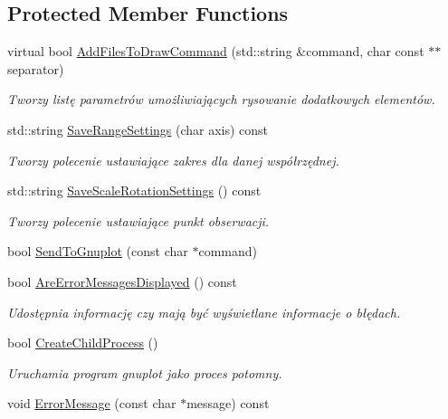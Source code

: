 \subsection*{Protected Member Functions}
\begin{DoxyCompactItemize}
\item 
virtual bool \hyperlink{class_pz_g_1_1_gnuplot_link_a0e0854467fcaf528a04a32e1e4e3fa37}{Add\+Files\+To\+Draw\+Command} (std\+::string \&command, char const $\ast$$\ast$separator)
\begin{DoxyCompactList}\small\item\em Tworzy listę parametrów umożliwiających rysowanie dodatkowych elementów. \end{DoxyCompactList}\item 
std\+::string \hyperlink{class_pz_g_1_1_gnuplot_link_a5b7fdc2909ad007b5915fe30439fbb9e}{Save\+Range\+Settings} (char axis) const 
\begin{DoxyCompactList}\small\item\em Tworzy polecenie ustawiające zakres dla danej współrzędnej. \end{DoxyCompactList}\item 
std\+::string \hyperlink{class_pz_g_1_1_gnuplot_link_aa95135aad76f86efd1d60518abacbeb4}{Save\+Scale\+Rotation\+Settings} () const 
\begin{DoxyCompactList}\small\item\em Tworzy polecenie ustawiające punkt obserwacji. \end{DoxyCompactList}\item 
bool \hyperlink{class_pz_g_1_1_gnuplot_link_acf0c0bf937eb87f9c14dedf2f01780bc}{Send\+To\+Gnuplot} (const char $\ast$command)
\item 
bool \hyperlink{class_pz_g_1_1_gnuplot_link_a65e94fe30d1d5f4b369fecb344e4629f}{Are\+Error\+Messages\+Displayed} () const 
\begin{DoxyCompactList}\small\item\em Udostępnia informację czy mają być wyświetlane informacje o błędach. \end{DoxyCompactList}\item 
bool \hyperlink{class_pz_g_1_1_gnuplot_link_a81a78898b39cb0b4c79ea4f3c90bbeb5}{Create\+Child\+Process} ()
\begin{DoxyCompactList}\small\item\em Uruchamia program {\itshape gnuplot} jako proces potomny. \end{DoxyCompactList}\item 
void \hyperlink{class_pz_g_1_1_gnuplot_link_af16d87b0f93073a69b921668790884f4}{Error\+Message} (const char $\ast$message) const 
$$
\end{DoxyCompactItemize}
